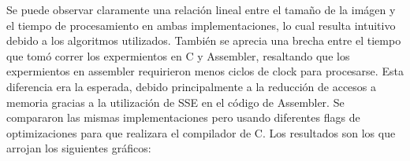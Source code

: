 \documentclass[a4paper]{article}
\begin{document}
\begin{figure}[!ht]
    \centering
    \begin{floatrow}
    \end{floatrow}
\end{figure}

Se puede observar claramente una relación lineal entre el tamaño de la imágen y el tiempo de procesamiento en ambas implementaciones, lo cual resulta intuitivo debido a los algoritmos utilizados. También se aprecia una brecha entre el tiempo que tomó correr los expermientos en C y Assembler, resaltando que los expermientos en assembler requirieron menos ciclos de clock para procesarse. Esta diferencia era la esperada, debido principalmente a la reducción de accesos a memoria gracias a la utilización de SSE en el código de Assembler. Se compararon las mismas implementaciones pero usando diferentes flags de optimizaciones para que realizara el compilador de C. Los resultados son los que arrojan los siguientes gráficos:
\end{document}
